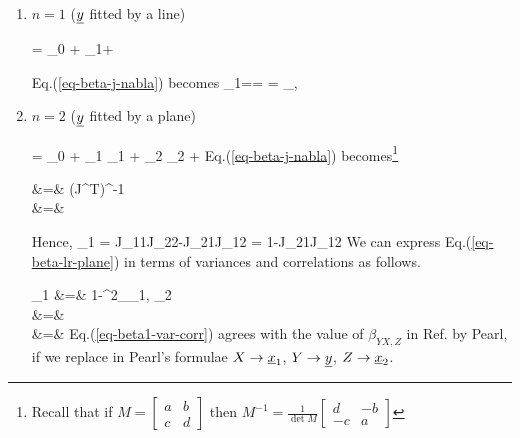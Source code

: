 \begin{enumerate}
\item $n=1$ (${\underline{y}}$ fitted by a line)

\beq
\rvy = \beta_0 + \beta_1\rvx + \rveps
\eeq

Eq.(\ref{eq-beta-j-nabla}) becomes
\beq
\beta_1=\pder{\rvy}{\rvx}=
\frac{\av{\rvx,\rvy}}{\av{\rvx,\rvx}}
=
\rho_{\rvx,\rvy}
\frac{\s_\rvy}{\s_\rvx}
\eeq


\item $n=2$ (${\underline{y}}$ fitted by a plane)


\beq
\rvy = \beta_0 + \beta_1 \rvx_1 + \beta_2 \rvx_2 +\rveps
\eeq
Eq.(\ref{eq-beta-j-nabla})
becomes\footnote{
Recall that if
$
M=
\left[
\begin{array}{cc}
a&b
\\
c&d
\end{array}
\right]
$
then
$
M^{-1}
=
\frac{1}{\det M}
\left[
\begin{array}{cc}
d&-b
\\
-c&a
\end{array}
\right]
$
}


\beqa
{}
&=&
(J^T)^{-1}
\\
&=&
\left[
\begin{array}{cc}
J_{22}&-J_{21}
\\
-J_{12}&J_{11}
\end{array}
\right]
\eeqa


Hence,
\beq
\beta_1
=
{
J_{11}J_{22}-J_{21}J_{12}
}=
{
1-J_{21}J_{12}
}
\label{eq-beta-lr-plane}
\eeq
We can express
Eq.(\ref{eq-beta-lr-plane})
in terms of variances
and correlations as follows.


\beqa
\beta_1 &=&
{1-\rho^2_{\rvx_1, \rvx_2}}
\\
&=&
\\
&=&
\label{eq-beta1-var-corr}
\eeqa
Eq.(\ref{eq-beta1-var-corr}) agrees with
the
value of $\beta_{YX, Z}$ in
Ref.\cite{pearl-lin-reg}
by Pearl,
if  we replace in Pearl's
formulae $X\rightarrow {\underline{x}}_1$,
$Y\rightarrow {\underline{y}}$, $Z\rightarrow {\underline{x}}_2$.


\end{enumerate}
